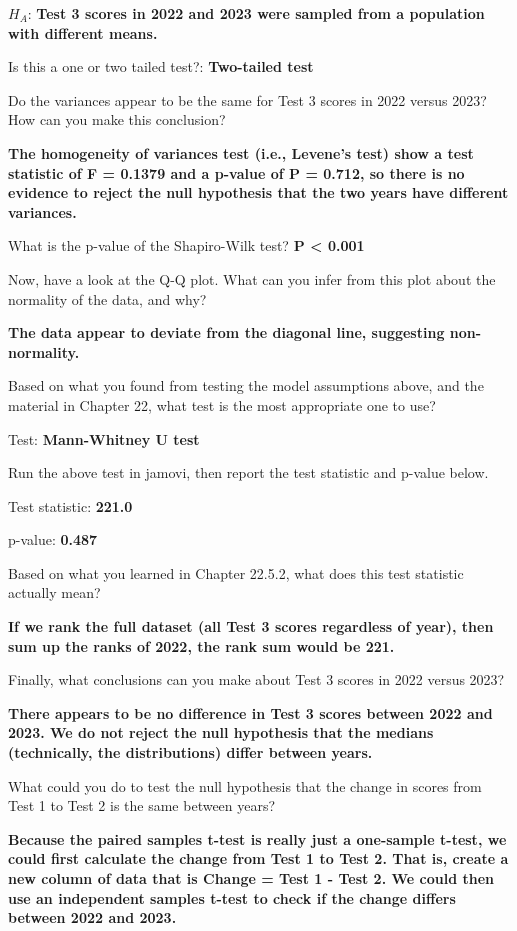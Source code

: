 \documentclass[
  openany]{krantz}
\begin{document}
\(H_{A}\): \textbf{Test 3 scores in 2022 and 2023 were sampled from a population with different means.}

Is this a one or two tailed test?: \textbf{Two-tailed test}

Do the variances appear to be the same for Test 3 scores in 2022 versus 2023? How can you make this conclusion?

\textbf{The homogeneity of variances test (i.e., Levene's test) show a test statistic of F = 0.1379 and a p-value of P = 0.712, so there is no evidence to reject the null hypothesis that the two years have different variances.}

What is the p-value of the Shapiro-Wilk test? \textbf{P \textless{} 0.001}

Now, have a look at the Q-Q plot. What can you infer from this plot about the normality of the data, and why?

\textbf{The data appear to deviate from the diagonal line, suggesting non-normality.}

Based on what you found from testing the model assumptions above, and the material in Chapter 22, what test is the most appropriate one to use?

Test: \textbf{Mann-Whitney U test}

Run the above test in jamovi, then report the test statistic and p-value below.

Test statistic: \textbf{221.0}

p-value: \textbf{0.487}

Based on what you learned in Chapter 22.5.2, what does this test statistic actually mean?

\textbf{If we rank the full dataset (all Test 3 scores regardless of year), then sum up the ranks of 2022, the rank sum would be 221.}

Finally, what conclusions can you make about Test 3 scores in 2022 versus 2023?

\textbf{There appears to be no difference in Test 3 scores between 2022 and 2023. We do not reject the null hypothesis that the medians (technically, the distributions) differ between years.}

What could you do to test the null hypothesis that the change in scores from Test 1 to Test 2 is the same between years?

\textbf{Because the paired samples t-test is really just a one-sample t-test, we could first calculate the change from Test 1 to Test 2. That is, create a new column of data that is Change = Test 1 - Test 2. We could then use an independent samples t-test to check if the change differs between 2022 and 2023.}
\end{document}
